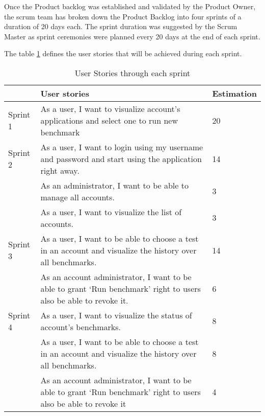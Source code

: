 Once the Product backlog was established and validated by the Product Owner, the
scrum team has broken down the Product Backlog into four sprints of a duration
of 20 days each. The sprint duration was suggested by the Scrum Master as sprint
ceremonies were planned every 20 days at the end of each sprint.

The table \hyperref[sprints]{\ref{sprints}} defines the user stories that will
be achieved during each sprint.

\begin{table}[]
\centering
\label{sprints}
\begin{tabular}{|p{2cm}|p{7cm}|p{2cm}|}
                           \hline
                              &  User stories & Estimation \\ \hline
Sprint 1                      &  As a user, I want to visualize account’s applications and select one to run new benchmark &  20\\ \hline

{\multirow{2}{*}{}} Sprint 2  &  As a user, I want to login using my username and password and start using the application right away.  &  14\\ \cline{2-3}
{}                            &  As an administrator, I want to be able to manage all accounts. &  3\\ \cline{2-3}
{}                            &  As a user, I want to visualize the list of accounts. &  3\\ \hline

{\multirow{3}{*}{}} Sprint 3  &  As a user, I want to be able to choose a test in an account and visualize the history over all benchmarks.& 14 \\ \cline{2-3}
{}                            &  As an account administrator, I want to be able to grant ‘Run benchmark’  right to users also be able to revoke it.&  6\\ \hline
{\multirow{3}{*}{}} Sprint 4  &  As a user, I want to visualize the status of account’s benchmarks. & 8 \\ \cline{2-3}
{}                            &   As a user, I want to be able to choose a test in an account and visualize the history over all benchmarks. & 8  \\ \cline{2-3}
{}                            &  As an account administrator, I want to be able to grant ‘Run benchmark’  right to users also be able to revoke it&  4\\ \hline

\end{tabular}
\caption{User Stories through each sprint}
\end{table}
